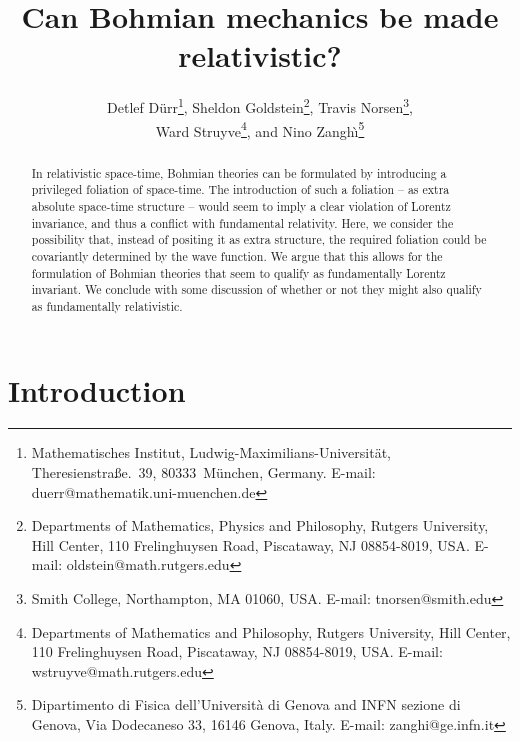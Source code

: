 \documentclass[12pt]{article}
\begin{document}
\title{Can  Bohmian mechanics be made relativistic?}

\author{
Detlef D\"urr\footnote{Mathematisches Institut, Ludwig-Maximilians-Universit\"at, 
	Theresienstra{\ss}e.~39, 80333~M\"unchen, Germany. E-mail: duerr@mathematik.uni-muenchen.de},
Sheldon Goldstein\footnote{Departments of Mathematics, Physics and
     Philosophy, Rutgers University, Hill Center,  
     110 Frelinghuysen Road, Piscataway, NJ 08854-8019, USA.
     E-mail: oldstein@math.rutgers.edu},
Travis Norsen\footnote{Smith College, Northampton, MA 01060, USA. E-mail: tnorsen@smith.edu},\\
Ward Struyve\footnote{Departments of Mathematics and Philosophy,
     Rutgers University, Hill Center,  
     110 Frelinghuysen Road, Piscataway, NJ 08854-8019, USA.
     E-mail: wstruyve@math.rutgers.edu},
and Nino Zangh\`\i\footnote{Dipartimento di Fisica dell'Universit\`a
     di Genova and INFN sezione di Genova, Via Dodecaneso 33, 16146
     Genova, Italy. E-mail: zanghi@ge.infn.it}
}

\maketitle

\begin{abstract}
\noindent
In relativistic space-time, Bohmian theories can be formulated by
introducing a privileged foliation of space-time. The introduction of
such a foliation -- as extra absolute space-time structure -- would seem
to imply a clear violation of Lorentz invariance, and thus a conflict
with fundamental relativity. Here, we consider the possibility that,
instead of positing it as extra structure, the required foliation
could be covariantly determined by the wave function. We argue that this
allows for the formulation of Bohmian theories that seem to qualify as
fundamentally Lorentz invariant. We conclude with some discussion of
whether or not they might also qualify as fundamentally relativistic.
\end{abstract}





\renewcommand{\baselinestretch}{1.1}



\section{Introduction}
\label{sec1}
\end{document}
